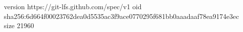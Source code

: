 version https://git-lfs.github.com/spec/v1
oid sha256:6d664f00023762dea0d5535ac3f9ace0770295f681bb0aaadaaf78ea9174e3ec
size 21960
